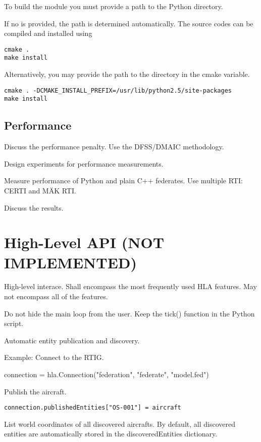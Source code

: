 \documentclass[12pt,a4paper]{howto}
\begin{document}
To build the  module you must provide a path to the Python
 directory.

If no  is provided, the path is determined
automatically. The source codes can be compiled and installed using
\begin{verbatim}
cmake .
make install
\end{verbatim}

Alternatively, you may provide the path to the  directory
in the  cmake variable.
\begin{verbatim}
cmake . -DCMAKE_INSTALL_PREFIX=/usr/lib/python2.5/site-packages
make install
\end{verbatim}

\subsection{Performance}

Discuss the performance penalty. Use the DFSS/DMAIC methodology.

Design experiments for performance measurements.

Measure performance of Python and plain C++ federates. Use multiple RTI: CERTI and MÄK RTI.

Discuss the results.




\section{High-Level API (NOT IMPLEMENTED)}
High-level interace. Shall encompass the most frequently used HLA features. May not encompass all of the features.

Do not hide the main loop from the user. Keep the tick() function in the Python script.

Automatic entity publication and discovery.

Example:
Connect to the RTIG.

connection = hla.Connection("federation", "federate", "model.fed")

Publish the aircraft.

\begin{verbatim}
connection.publishedEntities["OS-001"] = aircraft
\end{verbatim}

List world coordinates of all discovered aircrafts. By default, all discovered
entities are automatically stored in the discoveredEntities dictionary.
\end{document}
